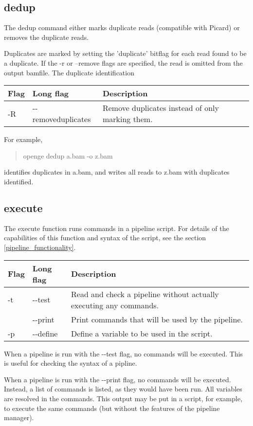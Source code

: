 \documentclass[11pt]{article}
\newcommand {\cmd}[1] {\begin{quote}#1\end{quote}}
\begin{document}
\subsection {dedup}
The dedup command either marks duplicate reads (compatible with Picard) or removes the duplicate reads. 

Duplicates are marked by setting the 'duplicate' bitflag for each read found to be a duplicate. If the -r or --remove flags are specified, the read is omitted from the output bamfile. The duplicate identification 

\begin{center}
\begin{tabular}{llp{3.5in}}
\hline
Flag&Long flag&Description\\ \hline
-R&{-}{-}removeduplicates&Remove duplicates instead of only marking them.\\
\end{tabular}
\end{center}

For example,
\cmd{openge dedup a.bam -o z.bam} 
identifies duplicates in a.bam, and writes all reads to z.bam with duplicates identified.

\subsection {execute}
\label{execute}

The execute function runs commands in a pipeline script. For details of the capabilities of this function and syntax of the script, see the section \ref{pipeline_functionality}.

\begin{center}
\begin{tabular}{llp{3.5in}}
\hline
Flag&Long flag&Description\\ \hline
-t&{-}{-}test&Read and check a pipeline without actually executing any commands.\\
&{-}{-}print&Print commands that will be used by the pipeline.\\
-p&{-}{-}define&Define a variable to be used in the script.\\
\end{tabular}
\end{center}

When a pipeline is run with the {-}{-}test flag, no commands will be executed. This is useful for checking the syntax of a pipline.

When a pipeline is run with the {-}{-}print flag, no commands will be executed. Instead, a list of commands is listed, as they would have been run. All variables are resolved in the commands. This output may be put in a script, for example, to execute the same commands (but without the features of the pipeline manager).
\end{document}
